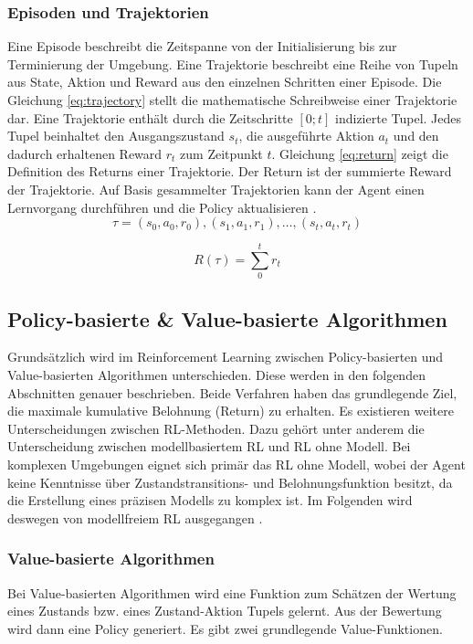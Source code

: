 \subsubsection{Episoden und Trajektorien}
Eine Episode beschreibt die Zeitspanne von der Initialisierung bis zur Terminierung der Umgebung. Eine Trajektorie beschreibt eine Reihe von Tupeln aus State, Aktion und Reward aus den einzelnen Schritten einer Episode. Die Gleichung \ref{eq:trajectory} stellt die mathematische Schreibweise einer Trajektorie dar. Eine Trajektorie enthält durch die Zeitschritte $[0;t]$ indizierte Tupel. Jedes Tupel beinhaltet den Ausgangszustand $s_t$, die ausgeführte Aktion $a_t$ und den dadurch erhaltenen Reward $r_t$ zum Zeitpunkt $t$. Gleichung \ref{eq:return} zeigt die Definition des Returns einer Trajektorie. Der Return ist der summierte Reward der Trajektorie. Auf Basis gesammelter Trajektorien kann der Agent einen Lernvorgang durchführen und die Policy aktualisieren \cite{FoundationsDeepRL}.
\begin{equation}
    \tau = (s_0,a_0,r_0), (s_1,a_1,r_1), \dots, (s_t,a_t,r_t)
    \label{eq:trajectory}
\end{equation}

\begin{equation}
    R(\tau)=\sum_{0}^{t} r_t
    \label{eq:return}
\end{equation}


\subsection{Policy-basierte \& Value-basierte Algorithmen}
Grundsätzlich wird im Reinforcement Learning zwischen Policy-basierten und Value-basierten Algorithmen unterschieden. Diese werden in den folgenden Abschnitten genauer beschrieben. Beide Verfahren haben das grundlegende Ziel, die maximale kumulative Belohnung (Return) zu erhalten.
Es existieren weitere Unterscheidungen zwischen RL-Methoden. Dazu gehört unter anderem die Unterscheidung zwischen modellbasiertem RL und RL ohne Modell. Bei komplexen Umgebungen eignet sich primär das RL ohne Modell, wobei der Agent keine Kenntnisse über Zustandstransitions- und Belohnungsfunktion besitzt, da die Erstellung eines präzisen Modells zu komplex ist. Im Folgenden wird deswegen von modellfreiem RL ausgegangen \cite{deepRL-2020}.

\subsubsection{Value-basierte Algorithmen}\label{sec:value}
Bei Value-basierten Algorithmen wird eine Funktion zum Schätzen der Wertung eines Zustands bzw. eines Zustand-Aktion Tupels gelernt. Aus der Bewertung wird dann eine Policy generiert. Es gibt zwei grundlegende Value-Funktionen.

